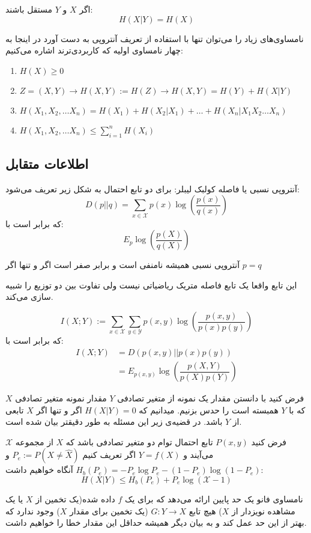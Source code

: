 \begin{theorem}
اگر
$X$
و
$Y$
مستقل باشند:
$$H(X|Y) = H(X)$$
\end{theorem}
\begin{theorem}
	نامساوی‌های زیاد را می‌توان تنها با استفاده از تعریف آنتروپی به دست آورد در اینجا به چهار نامساوی اولیه که کاربردی‌ترند اشاره می‌کنیم:
	\begin{enumerate}
\item $H(X) \geq 0 $
\item $Z = (X, Y) \rightarrow H(X, Y) := H(Z) \rightarrow H(X, Y) = H(Y) + H(X|Y) $
\item $H(X_1, X_2, \dots X_n) = H(X_1) + H(X_2 | X_1) + \dots + H(X_n | X_1 X_2 \dots X_n)$
\item $H(X_1, X_2, \dots X_n) \leq \sum_{i = 1}^{n} H(X_i)$
\end{enumerate}
\end{theorem}
\subsection{اطلاعات متقابل}
\begin{definition}
آنتروپی نسبی یا فاصله کولبک لیبلر: برای دو تابع احتمال به شکل زیر تعریف می‌شود:
$$
D(p||q) = \sum_{x \in \mathcal{X}} p(x) \log(\dfrac{p(x)}{q(x)})
$$
که برابر است با:
$$E_p \log(\dfrac{p(X)}{q(X)})$$
\end{definition}
\begin{theorem}
آنتروپی نسبی همیشه نامنفی است و برابر صفر است اگر و تنها اگر
$p = q$
\end{theorem}
این تابع واقعا یک تابع فاصله متریک ریاضیاتی نیست ولی تفاوت بین دو توزیع را شبیه سازی می‌کند.
\begin{definition}
$$I(X; Y) := \sum_{x \in \mathcal{X}} \sum_{y \in \mathcal{Y}} p(x, y) \log(\dfrac{p(x, y)}{p(x)p(y)})$$
که برابر است با:
\begin{align*}
    I(X;Y) &= D(p(x, y) || p(x)p(y))
    \\
    &= E_{p(x, y)} \log(\dfrac{p(X, Y)}{p(X)p(Y)})
\end{align*}
\end{definition}

فرض کنید با دانستن مقدار یک نمونه از متغیر تصادفی
$Y$
مقدار نمونه متغیر تصادفی
$X$
که با
$Y$
همبسته است را حدس بزنیم. میدانیم که
$H(X|Y) = 0$
اگر و تنها اگر
$X$
تابعی از
$Y$
باشد. در قضیه‌ی زیر این مسئله به طور دقیقتر بیان شده است.
\begin{theorem}
فرض کنید
$P(x, y)$
تابع احتمال توام دو متغیر تصادفی باشد که
$X$
از مجموعه
$\mathcal{X}$
می‌آیند و
$Y = f(X)$
اگر تعریف کنیم
$P_e := P(X \neq \hat{X})$
و
$H_b(P_e) = - P_e \log P_e - (1 - P_e) \log(1 - P_e)$
آنگاه خواهیم داشت:
$$H(X|Y) \leq H_b(P_e) + P_e \log(\mathcal{X} - 1)$$
\end{theorem}
\begin{remark}
نامساوی فانو یک حد پایین ارائه می‌دهد که برای یک
$f$
داده شده(یک تخمین از
$X$
یا یک مشاهده نویزدار از
$X$)
هیچ تابع
$G:Y \rightarrow X$
(یک تخمین برای مقدار
$X$)
وجود ندارد که بهتر از این حد عمل کند و به بیان دیگر همیشه حداقل این مقدار خطا را خواهیم داشت.
\end{remark}

